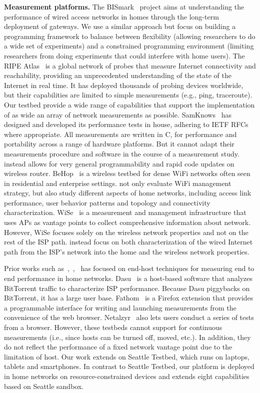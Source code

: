 \textbf{Measurement platforms. }The BISmark~\cite{183951} project aims at understanding the performance of wired access networks in homes through the long-term deployment of gateways. We use a similar approach but focus on building a programming framework to balance between flexibility (allowing researchers to do a wide set of experiments) and a constrained programming environment (limiting researchers from doing experiments that could interfere with home users). The RIPE Atlas~\cite{ripeatlas} is a global network of probes that measure Internet connectivity and reachability, providing an unprecedented understanding of the state of the Internet in real time. It has deployed thousands of probing devices worldwide, but their capabilities are limited to simple measurements (e.g., ping, traceroute). Our testbed provide a wide range of capabilities that support the implementation of as wide an array of network measurements as possible. SamKnows~\cite{samknows} has designed and developed its performance tests in house, adhering to IETF RFCs where appropriate. All measurements are written in C, for performance and portability across a range of hardware platforms. But it cannot adapt their measurements procedure and software in the course of a measurement study. \sysname instead allows for very general programmability and rapid code updates on wireless router. BeHop~\cite{yiakoumis2014behop} is a wireless testbed for dense WiFi networks often seen in residential and enterprise settings. \sysname not only evaluate WiFi management strategy, but also study different aspects of home networks, including access link performance, user behavior patterns and topology and connectivity characterization. WiSe~\cite{patro2013observing} is a measurement and management infrastructure that uses APs as vantage points to collect comprehensive information about network. However, WiSe focuses solely on the wireless network properties and not on the rest of the ISP path. \sysname instead focus on both characterization of the wired Internet path from the ISP’s network into the home and the wireless network properties.

Prior works such as~\cite{sanchez2014measurement},~\cite{dhawan2012fathom},~\cite{kreibich2010netalyzr} has focused on end-host techniques for measuring end to end performance in home networks. Dasu~\cite{sanchez2014measurement} is a host-based software that analyzes BitTorrent traffic to characterize ISP performance. Because Dasu piggybacks on BitTorrent, it has a large user base. Fathom~\cite{dhawan2012fathom} is a Firefox extension that provides a programmable interface for writing and launching measurements from the convenience of the web browser. Netalzyr~\cite{kreibich2010netalyzr} also lets users conduct a series of tests from a browser. However, these testbeds cannot support for continuous measurements (i.e., since hosts can be turned off, moved, etc.). In addition, they do not reflect the performance of a fixed network vantage point due to the limitation of host. Our work extends on Seattle Testbed\cite{cappos2009seattle}, which runs on laptops, tablets and smartphones. In contrast to Seattle Testbed, our platform is deployed in home networks on resource-constrained devices and extends eight capabilities based on Seattle sandbox.


